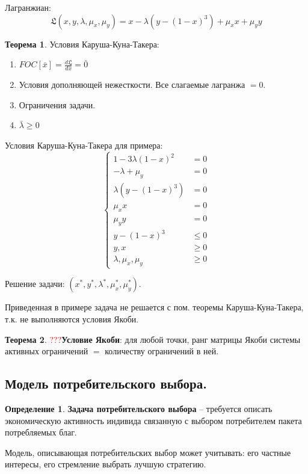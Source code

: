 \documentclass[reqno]{article}
\theoremstyle{definition}
\theoremstyle{definition}
\theoremstyle{definition}
\theoremstyle{definition}
\theoremstyle{definition}
\theoremstyle{definition}
\newtheorem{thm}{Теорема}[section]
\theoremstyle{definition}
\newtheorem*{defi}{Определение}
\theoremstyle{definition}
\theoremstyle{definition}
\begin{document}
			Лагранжиан:
			$$\mathfrak{L}(x, y, \lambda, \mu_x, \mu_y) = x - \lambda(y - (1 - x)^3) + \mu_xx + \mu_yy$$
		
			\begin{thm}
				Условия Каруша-Куна-Такера:
				\begin{enumerate}
					\item $FOC[\bar{x}] = \frac{d\mathfrak{L}}{d\bar{x}} = \bar{0}$
					\item Условия дополняющей нежесткости. Все слагаемые лагранжа $= 0$.
					\item Ограничения задачи.
					\item $\bar{\lambda} \geq 0$
				\end{enumerate}
			\end{thm}
		
			Условия Каруша-Куна-Такера для примера:
			\begin{equation}
				\begin{cases}
					1 - 3\lambda(1 - x)^2 & = 0\\
					-\lambda + \mu_y& = 0\\
					\lambda(y - (1 - x)^3)& = 0\\
					\mu_xx & = 0\\
					\mu_yy & = 0\\
					y - (1-x)^3 &\leq 0\\
					y, x &\geq 0\\
					\lambda, \mu_x, \mu_y &\geq 0
				\end{cases}
			\end{equation}
		
			Решение задачи: $(x^*, y^*, \lambda^*, \mu_x^*, \mu_y^*)$.
			
			Приведенная в примере задача не решается с пом. теоремы Каруша-Куна-Такера, т.к. не выполняются условия Якоби.
			
			\begin{thm}
				\textcolor{red}{???}\textbf{Условие Якоби}: для любой точки, ранг матрицы Якоби системы активных ограничений $=$ количеству ограничений в ней.			
			\end{thm}
			
		\subsection{Модель потребительского выбора.}
			
			\begin{defi}
				\textbf{Задача потребительского выбора} -- требуется описать экономическую активность индивида связанную с выбором потребителем пакета потребляемых благ.
				
				Модель, описывающая потребительских выбор может учитывать: его частные интересы, его стремление выбрать лучшую стратегию.
			\end{defi}
			
\end{document}
